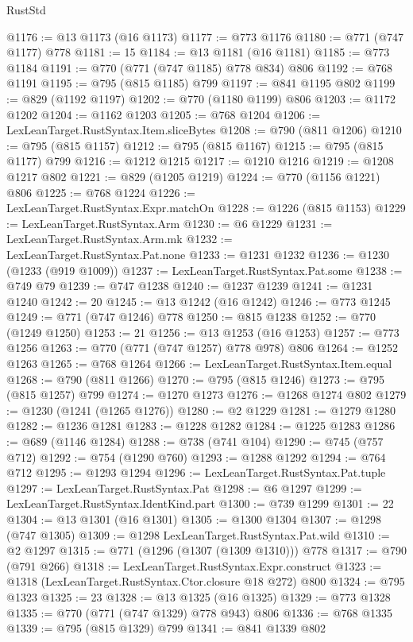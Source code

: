\begin{lexlean}{RustStd}
\begin{coremodule}
{\begin{coremodule}
{{{{{{{{{{{{{{{@1176 := @13 @1173 (@16 @1173)
@1177 := @773 @1176
@1180 := @771 (@747 @1177) @778
@1181 := 15
@1184 := @13 @1181 (@16 @1181)
@1185 := @773 @1184
@1191 := @770 (@771 (@747 @1185) @778 @834) @806
@1192 := @768 @1191
@1195 := @795 (@815 @1185) @799
@1197 := @841 @1195 @802
@1199 := @829 (@1192 @1197)
@1202 := @770 (@1180 @1199) @806
@1203 := @1172 @1202
@1204 := @1162 @1203
@1205 := @768 @1204
@1206 := LexLeanTarget.RustSyntax.Item.sliceBytes
@1208 := @790 (@811 @1206)
@1210 := @795 (@815 @1157)
@1212 := @795 (@815 @1167)
@1215 := @795 (@815 @1177) @799
@1216 := @1212 @1215
@1217 := @1210 @1216
@1219 := @1208 @1217 @802
@1221 := @829 (@1205 @1219)
@1224 := @770 (@1156 @1221) @806
@1225 := @768 @1224
@1226 := LexLeanTarget.RustSyntax.Expr.matchOn
@1228 := @1226 (@815 @1153)
@1229 := LexLeanTarget.RustSyntax.Arm
@1230 := @6 @1229
@1231 := LexLeanTarget.RustSyntax.Arm.mk
@1232 := LexLeanTarget.RustSyntax.Pat.none
@1233 := @1231 @1232
@1236 := @1230 (@1233 (@919 @1009))
@1237 := LexLeanTarget.RustSyntax.Pat.some
@1238 := @749 @79
@1239 := @747 @1238
@1240 := @1237 @1239
@1241 := @1231 @1240
@1242 := 20
@1245 := @13 @1242 (@16 @1242)
@1246 := @773 @1245
@1249 := @771 (@747 @1246) @778
@1250 := @815 @1238
@1252 := @770 (@1249 @1250)
@1253 := 21
@1256 := @13 @1253 (@16 @1253)
@1257 := @773 @1256
@1263 := @770 (@771 (@747 @1257) @778 @978) @806
@1264 := @1252 @1263
@1265 := @768 @1264
@1266 := LexLeanTarget.RustSyntax.Item.equal
@1268 := @790 (@811 @1266)
@1270 := @795 (@815 @1246)
@1273 := @795 (@815 @1257) @799
@1274 := @1270 @1273
@1276 := @1268 @1274 @802
@1279 := @1230 (@1241 (@1265 @1276))
@1280 := @2 @1229
@1281 := @1279 @1280
@1282 := @1236 @1281
@1283 := @1228 @1282
@1284 := @1225 @1283
@1286 := @689 (@1146 @1284)
@1288 := @738 (@741 @104)
@1290 := @745 (@757 @712)
@1292 := @754 (@1290 @760)
@1293 := @1288 @1292
@1294 := @764 @712
@1295 := @1293 @1294
@1296 := LexLeanTarget.RustSyntax.Pat.tuple
@1297 := LexLeanTarget.RustSyntax.Pat
@1298 := @6 @1297
@1299 := LexLeanTarget.RustSyntax.IdentKind.part
@1300 := @739 @1299
@1301 := 22
@1304 := @13 @1301 (@16 @1301)
@1305 := @1300 @1304
@1307 := @1298 (@747 @1305)
@1309 := @1298 LexLeanTarget.RustSyntax.Pat.wild
@1310 := @2 @1297
@1315 := @771 (@1296 (@1307 (@1309 @1310))) @778
@1317 := @790 (@791 @266)
@1318 := LexLeanTarget.RustSyntax.Expr.construct
@1323 := @1318 (LexLeanTarget.RustSyntax.Ctor.closure @18 @272) @800
@1324 := @795 @1323
@1325 := 23
@1328 := @13 @1325 (@16 @1325)
@1329 := @773 @1328
@1335 := @770 (@771 (@747 @1329) @778 @943) @806
@1336 := @768 @1335
@1339 := @795 (@815 @1329) @799
@1341 := @841 @1339 @802
}}}}}}}}}}}}}}}
\end{coremodule}}
\end{coremodule}
\end{lexlean}
